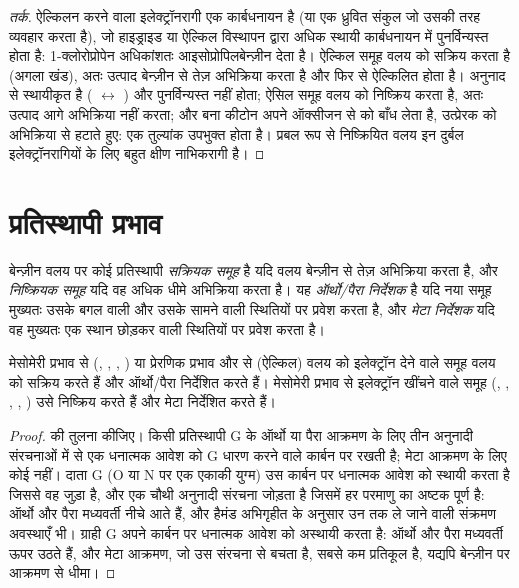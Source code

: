 \begin{proof}[तर्क]
ऐल्किलन करने वाला इलेक्ट्रॉनरागी एक कार्बधनायन है (या एक ध्रुवित संकुल जो उसकी तरह व्यवहार करता है),
जो हाइड्राइड या ऐल्किल विस्थापन द्वारा अधिक स्थायी कार्बधनायन में पुनर्विन्यस्त होता है: 1-क्लोरोप्रोपेन
अधिकांशतः आइसोप्रोपिलबेन्ज़ीन देता है। ऐल्किल समूह वलय को सक्रिय करता है (अगला खंड), अतः उत्पाद
बेन्ज़ीन से तेज़ अभिक्रिया करता है और फिर से ऐल्किलित होता है। 
अनुनाद से स्थायीकृत है ( $\leftrightarrow$ ) और पुनर्विन्यस्त नहीं होता; ऐसिल समूह
वलय को निष्क्रिय करता है, अतः उत्पाद आगे अभिक्रिया नहीं करता; और बना कीटोन अपने ऑक्सीजन से
 को बाँध लेता है, उत्प्रेरक को अभिक्रिया से हटाते हुए: एक तुल्यांक
उपभुक्त होता है। प्रबल रूप से निष्क्रियित वलय इन दुर्बल इलेक्ट्रॉनरागियों के लिए बहुत क्षीण नाभिकरागी है।
\end{proof}

\section{प्रतिस्थापी प्रभाव}

\begin{definition}[निर्देशक समूह]\label{def:b2:aromatic-substitution:directing}
बेन्ज़ीन वलय पर कोई प्रतिस्थापी \emph{सक्रियक समूह} है यदि
वलय बेन्ज़ीन से तेज़ अभिक्रिया करता है, और \emph{निष्क्रियक समूह} यदि वह
अधिक धीमे अभिक्रिया करता है। यह \emph{ऑर्थो/पैरा निर्देशक} है यदि नया
समूह मुख्यतः उसके बगल वाली और उसके सामने वाली स्थितियों पर प्रवेश करता है, और \emph{मेटा
निर्देशक} यदि वह मुख्यतः एक स्थान छोड़कर वाली स्थितियों पर प्रवेश करता है।
\end{definition}

\begin{proposition}[दाता और ग्राही]\label{prop:b2:aromatic-substitution:directing}
मेसोमेरी प्रभाव से (, , ,
) या प्रेरणिक प्रभाव और  से (ऐल्किल) वलय को इलेक्ट्रॉन देने वाले समूह वलय को सक्रिय करते हैं और
ऑर्थो/पैरा निर्देशित करते हैं। मेसोमेरी प्रभाव से इलेक्ट्रॉन खींचने वाले समूह (, , ,
, ) उसे निष्क्रिय करते हैं और मेटा निर्देशित करते हैं।
\end{proposition}

\begin{proof}
 की तुलना कीजिए। किसी प्रतिस्थापी G के ऑर्थो या पैरा आक्रमण के लिए
तीन अनुनादी संरचनाओं में से एक धनात्मक आवेश को G धारण करने वाले कार्बन पर रखती है; मेटा आक्रमण के लिए
कोई नहीं। दाता G (O या N पर एक एकाकी युग्म) उस कार्बन पर धनात्मक आवेश को स्थायी करता है जिससे वह
जुड़ा है, और एक चौथी अनुनादी संरचना जोड़ता है जिसमें हर परमाणु का अष्टक पूर्ण है: ऑर्थो
और पैरा मध्यवर्ती नीचे आते हैं, और हैमंड अभिगृहीत के अनुसार उन तक ले जाने वाली संक्रमण अवस्थाएँ
भी। ग्राही G अपने कार्बन पर धनात्मक आवेश को अस्थायी करता है: ऑर्थो और पैरा
मध्यवर्ती ऊपर उठते हैं, और मेटा आक्रमण, जो उस संरचना से बचता है, सबसे कम
प्रतिकूल है, यद्यपि बेन्ज़ीन पर आक्रमण से धीमा।
\end{proof}

